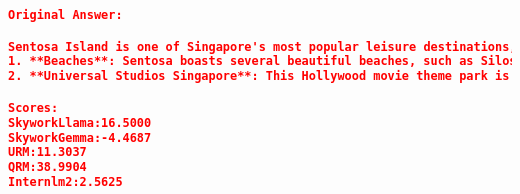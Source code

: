 \begin{lstlisting}[language=json,numbers=none]
Original Answer:

Sentosa Island is one of Singapore's most popular leisure destinations, offering a variety of attractions and activities that cater to all ages. Here are some of the highlights that visitors can enjoy:
1. **Beaches**: Sentosa boasts several beautiful beaches, such as Siloso Beach, Palawan Beach, and Tanjong Beach, which are great for sunbathing, swimming, beach volleyball, or simply relaxing.
2. **Universal Studios Singapore**: This Hollywood movie theme park is one of the island's biggest draws, featuring rides and attractions based on popular films and TV

Scores:
SkyworkLlama:16.5000
SkyworkGemma:-4.4687
URM:11.3037
QRM:38.9904
Internlm2:2.5625
\end{lstlisting}